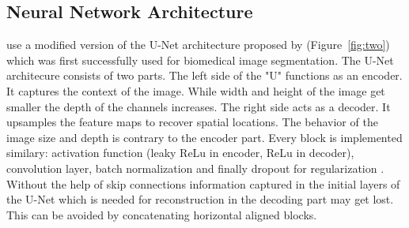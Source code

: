 \documentclass[acmtog]{techreportacmart}
\begin{document}

\subsection{Neural Network Architecture}
\cite{Thuerey20} use a modified version of the U-Net architecture proposed by \cite{ronneberger2015} (Figure~\ref{fig:two}) which was first successfully used for biomedical image segmentation.
The U-Net architecure consists of two parts. The left side of the "U" functions as an encoder. It captures the context of the image. While width and height of the image get smaller the depth of the channels increases. The right side acts as a decoder. It upsamples the feature maps to recover spatial locations. The behavior of the image size and depth is contrary to the encoder part. Every block is implemented similary: activation function (leaky ReLu in encoder, ReLu in decoder), convolution layer, batch normalization and finally dropout for regularization \cite{Thuerey20}. Without the help of skip connections information captured in the initial layers of the U-Net which is needed for reconstruction in the decoding part may get lost. This can be avoided by concatenating horizontal aligned blocks.
\end{document}

